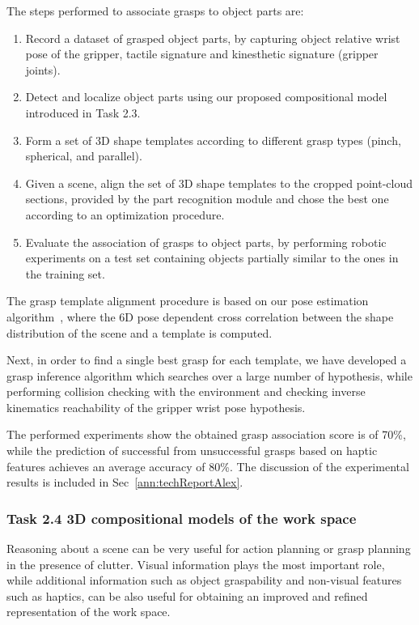 \documentclass[a4paper,11pt,pdf]{pacmanreport}
\begin{document}
The steps performed to associate grasps to object parts are:
\begin{enumerate}
\item Record a dataset of grasped object parts, by capturing object relative wrist pose of the gripper, tactile signature and kinesthetic signature (gripper joints).
\item Detect and localize object parts using our proposed compositional model introduced in Task 2.3.
\item Form a set of 3D shape templates according to different grasp types (pinch, spherical, and parallel).
\item Given a scene, align the set of 3D shape templates to the cropped point-cloud sections, provided by the part recognition module and chose the best one according to an optimization procedure.
\item Evaluate the association of grasps to object parts, by performing robotic experiments on a test set containing objects partially similar to the ones in the training set.
\end{enumerate}

The grasp template alignment procedure is based on our pose estimation algorithm~\cite{detry2010ac}, where the 6D pose dependent cross correlation between the shape distribution of the scene and a template is computed.

Next, in order to find a single best grasp for each template, we have developed a grasp inference algorithm which searches over a large number of hypothesis, while performing collision checking with the environment and checking inverse kinematics reachability of the gripper wrist pose hypothesis.

The performed experiments show the obtained grasp association score is of 70\%, 
while the prediction of successful from unsuccessful grasps based on haptic 
features achieves an average accuracy of 80\%. The discussion of the 
experimental results is included in Sec~\ref{ann:techReportAlex}.

\subsubsection{Task 2.4 3D compositional models of the work space}

Reasoning about a scene can be very useful for action planning or grasp planning in the presence of clutter. Visual information plays the most important role, while additional information such as object graspability and non-visual features such as haptics, can be also useful for obtaining an improved and refined representation of the work space.
\end{document}
